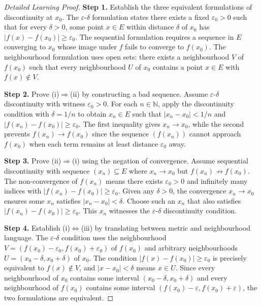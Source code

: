 \begin{proof}[Detailed Learning Proof]
\LRAProofBodyStart

\textbf{Step 1.} Establish the three equivalent formulations of discontinuity at $x_0$.
The $\varepsilon$-$\delta$ formulation states there exists a fixed $\varepsilon_0>0$ such that for every $\delta>0$, some point $x \in E$ within distance $\delta$ of $x_0$ has $|f(x)-f(x_0)|\ge \varepsilon_0$. The sequential formulation requires a sequence in $E$ converging to $x_0$ whose image under $f$ fails to converge to $f(x_0)$. The neighbourhood formulation uses open sets: there exists a neighbourhood $V$ of $f(x_0)$ such that every neighbourhood $U$ of $x_0$ contains a point $x \in E$ with $f(x)\notin V$.

\textbf{Step 2.} Prove (i)$\Rightarrow$(ii) by constructing a bad sequence.
Assume $\varepsilon$-$\delta$ discontinuity with witness $\varepsilon_0>0$. For each $n \in \mathbb{N}$, apply the discontinuity condition with $\delta=1/n$ to obtain $x_n \in E$ such that $|x_n-x_0|<1/n$ and $|f(x_n)-f(x_0)|\ge \varepsilon_0$. The first inequality gives $x_n\to x_0$, while the second prevents $f(x_n)\to f(x_0)$ since the sequence $(f(x_n))$ cannot approach $f(x_0)$ when each term remains at least distance $\varepsilon_0$ away.

\textbf{Step 3.} Prove (ii)$\Rightarrow$(i) using the negation of convergence.
Assume sequential discontinuity with sequence $(x_n) \subseteq E$ where $x_n\to x_0$ but $f(x_n)\not\to f(x_0)$. The non-convergence of $f(x_n)$ means there exists $\varepsilon_0>0$ and infinitely many indices with $|f(x_n)-f(x_0)|\ge \varepsilon_0$. Given any $\delta>0$, the convergence $x_n\to x_0$ ensures some $x_n$ satisfies $|x_n-x_0|<\delta$. Choose such an $x_n$ that also satisfies $|f(x_n)-f(x_0)|\ge \varepsilon_0$. This $x_n$ witnesses the $\varepsilon$-$\delta$ discontinuity condition.

\textbf{Step 4.} Establish (i)$\Leftrightarrow$(iii) by translating between metric and neighbourhood language.
The $\varepsilon$-$\delta$ condition uses the neighbourhood $V=(f(x_0)-\varepsilon_0, f(x_0)+\varepsilon_0)$ of $f(x_0)$ and arbitrary neighbourhoods $U=(x_0-\delta, x_0+\delta)$ of $x_0$. The condition $|f(x)-f(x_0)|\ge \varepsilon_0$ is precisely equivalent to $f(x)\notin V$, and $|x-x_0|<\delta$ means $x \in U$. Since every neighbourhood of $x_0$ contains some interval $(x_0-\delta, x_0+\delta)$ and every neighbourhood of $f(x_0)$ contains some interval $(f(x_0)-\varepsilon, f(x_0)+\varepsilon)$, the two formulations are equivalent.
\end{proof}

